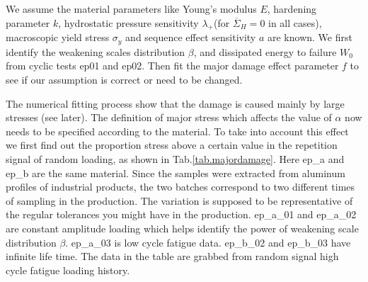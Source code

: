 We assume the material parameters like Young's modulus $E$, hardening parameter $k$, hydrostatic pressure sensitivity $\lambda_+$(for $\overline{\Sigma}_H=0$ in all cases), macroscopic yield stress $\sigma_y$ and sequence effect sensitivity $a$ are known. We first identify the weakening scales distribution $\beta$, and dissipated energy to failure $W_0$ from cyclic tests ep01 and ep02. Then fit the major damage effect parameter $f$ to see if our assumption is correct or need to be changed. 


The numerical fitting process show that the damage is caused mainly by large stresses (see later). The definition of major stress which affects the value of $\alpha$ now needs to be specified according to the material. To take into account this effect we first find out the proportion stress above a certain value in the repetition signal of random loading, as shown in Tab.\ref{tab.majordamage}.  Here ep\_a and ep\_b are the same material. Since the samples were extracted from aluminum profiles of industrial products,  the two batches correspond to two different times of sampling in the production. The variation is supposed to be representative of the regular tolerances you might have in the production. ep\_a\_01 and ep\_a\_02 are constant amplitude loading which helps identify the power of weakening scale distribution $\beta$. ep\_a\_03 is low cycle fatigue data.  ep\_b\_02 and ep\_b\_03 have infinite life time. The data in the table are grabbed from random signal high cycle fatigue loading history.

